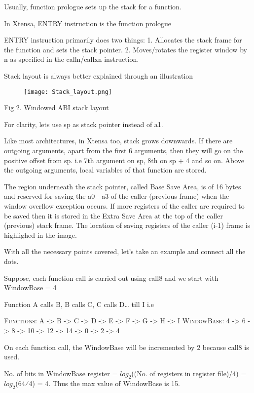 Usually, function prologue sets up the stack for a function.

In Xtensa, ENTRY instruction is the function prologue

ENTRY instruction primarily does two things:
1. Allocates the stack frame for the function and sets the stack pointer.
2. Moves/rotates the register window by n as specified in the calln/callxn instruction.

Stack layout is always better explained through an illustration
\begin{figure}[h]
	\texttt{[image: Stack\_layout.png]}
\end{figure}
Fig 2. Windowed ABI stack layout

For clarity, lets use sp as stack pointer instead of a1.

Like most architectures, in Xtensa too, stack grows downwards. If there are outgoing arguments, apart from the first 6 arguments, then they will go on the positive offset from sp. i.e 7th argument on sp, 8th on sp + 4 and so on. Above the outgoing arguments, local variables of that function are stored.

The region underneath the stack pointer, called Base Save Area, is of 16 bytes and reserved for saving the a0 - a3 of the caller (previous frame) when the window overflow exception occurs. If more registers of the caller are required to be saved then it is stored in the Extra Save Area at the top of the caller (previous) stack frame. The location of saving registers of the caller (i-1) frame is highlighed in the image.

With all the necessary points covered, let’s take an example and connect all the dots.

Suppose, each function call is carried out using call8 and we start with WindowBase = 4

Function A calls B, B calls C, C calls D… till I
i.e

\begin{tcolorbox}
\textsc{Functions:  A -> B -> C -> D -> E -> F -> G -> H -> I\newline}
\textsc{WindowBase: 4 -> 6 -> 8 -> 10 -> 12 -> 14 -> 0 -> 2 -> 4\newline}
\end{tcolorbox}

On each function call, the WindowBase will be incremented by 2 because call8 is used.

No. of bits in WindowBase register = $log_{2}$((No. of registers in register file)/4) = $log_{2}$(64⁄4) = 4. Thus the max value of WindowBase is 15.

